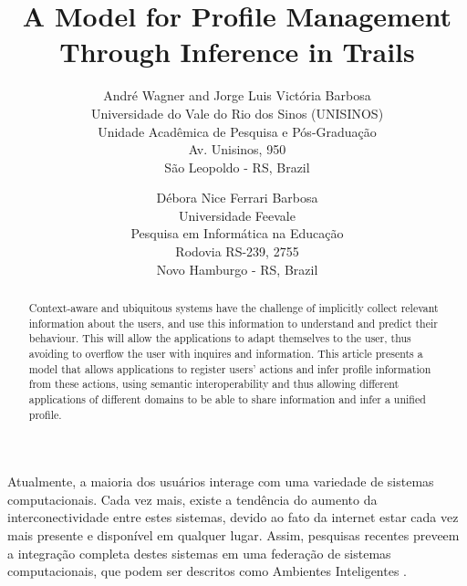 \documentclass[times, 10pt, twocolumn]{article}
\begin{document}
\title{A Model for Profile Management Through Inference in Trails}

\author{André Wagner and Jorge Luis Victória Barbosa\\
Universidade do Vale do Rio dos Sinos (UNISINOS)\\
Unidade Acadêmica de Pesquisa e Pós-Graduação\\
Av. Unisinos, 950\\
São Leopoldo - RS, Brazil\\
\and
Débora Nice Ferrari Barbosa\\
Universidade Feevale\\
Pesquisa em Informática na Educação\\
Rodovia RS-239, 2755\\ 
Novo Hamburgo - RS, Brazil
}


\maketitle
\thispagestyle{empty}

\begin{abstract}
Context-aware and ubiquitous systems have the challenge of implicitly collect relevant information about the users, and use this information to understand and predict their behaviour. This will allow the applications to adapt themselves to the user, thus avoiding to overflow the user with inquires and information. This article presents a model that allows applications to register users' actions and infer profile information from these actions, using semantic interoperability and thus allowing different applications of different domains to be able to share information and infer a unified profile.
\end{abstract}

\label{ch:introducao}

Atualmente, a maioria dos usuários interage com uma variedade de sistemas computacionais. Cada vez mais, existe a tendência do aumento da interconectividade entre estes sistemas, devido ao fato da internet estar cada vez mais presente e disponível em qualquer lugar. Assim, pesquisas recentes preveem a integração completa destes sistemas em uma federação de sistemas computacionais, que podem ser descritos como Ambientes Inteligentes \cite{heckmann05}.
\end{document}
